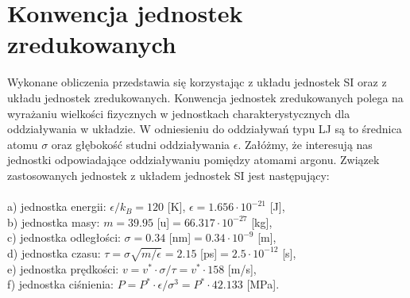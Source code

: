 \documentclass[12pt,a4paper,openright]{report} %
\begin{document}
\section{Konwencja jednostek zredukowanych}
\label{redunit}
%
Wykonane obliczenia przedstawia się korzystając z układu jednostek SI oraz z układu jednostek zredukowanych. Konwencja jednostek zredukowanych polega na wyrażaniu wielkości fizycznych w jednostkach charakterystycznych dla oddziaływania w układzie. W odniesieniu do oddziaływań typu LJ są to średnica atomu $\sigma$ oraz głębokość studni oddziaływania $\epsilon$. Załóżmy, że interesują nas jednostki odpowiadające oddziaływaniu pomiędzy atomami argonu. Związek zastosowanych jednostek z układem jednostek SI jest następujący: \\
\\
{a) jednostka energii:} $\epsilon/k_B = 120$ [K], $\epsilon = 1.656 \cdot 10^{-21}$ [J],\\
{b) jednostka masy:} $m=39.95$ [u]$=66.317 \cdot 10^{-27}$ [kg], \\
{c) jednostka odległości:} $\sigma=0.34$ [nm]$ = 0.34 \cdot 10^{-9}$ [m],\\
{d) jednostka czasu:} $\tau = \sigma \sqrt{m/\epsilon} = 2.15$ [ps]$ = 2.5 \cdot 10^{-12}$ [s], \\
{e) jednostka prędkości:} $v=v^{*} \cdot {\sigma / \tau} = v^{*} \cdot 158$ [m/s], \\
{f) jednostka ciśnienia:} $P=P^{*} \cdot \epsilon / \sigma^{3} = P^{*} \cdot 42.133$ [MPa].
%
\end{document}

